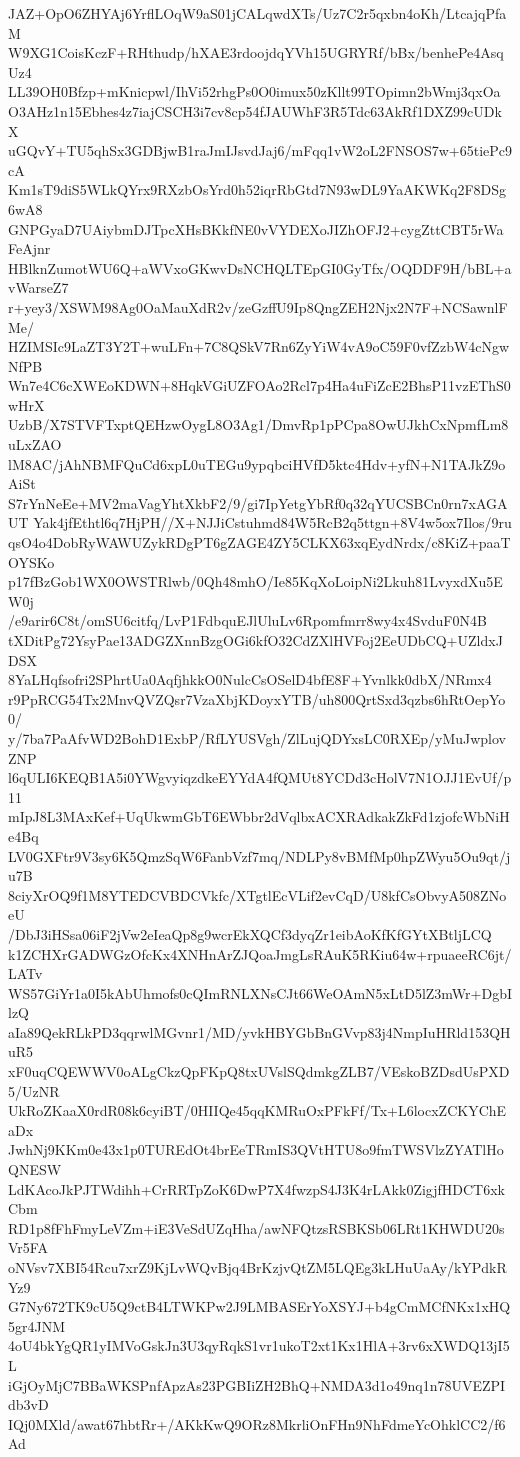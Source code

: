 JAZ+OpO6ZHYAj6YrflLOqW9aS01jCALqwdXTs/Uz7C2r5qxbn4oKh/LtcajqPfaM
W9XG1CoisKczF+RHthudp/hXAE3rdoojdqYVh15UGRYRf/bBx/benhePe4AsqUz4
LL39OH0Bfzp+mKnicpwl/IhVi52rhgPs0O0imux50zKllt99TOpimn2bWmj3qxOa
O3AHz1n15Ebhes4z7iajCSCH3i7cv8cp54fJAUWhF3R5Tdc63AkRf1DXZ99cUDkX
uGQvY+TU5qhSx3GDBjwB1raJmIJsvdJaj6/mFqq1vW2oL2FNSOS7w+65tiePc9cA
Km1sT9diS5WLkQYrx9RXzbOsYrd0h52iqrRbGtd7N93wDL9YaAKWKq2F8DSg6wA8
GNPGyaD7UAiybmDJTpcXHsBKkfNE0vVYDEXoJIZhOFJ2+cygZttCBT5rWaFeAjnr
HBlknZumotWU6Q+aWVxoGKwvDsNCHQLTEpGI0GyTfx/OQDDF9H/bBL+avWarseZ7
r+yey3/XSWM98Ag0OaMauXdR2v/zeGzffU9Ip8QngZEH2Njx2N7F+NCSawnlFMe/
HZIMSIc9LaZT3Y2T+wuLFn+7C8QSkV7Rn6ZyYiW4vA9oC59F0vfZzbW4cNgwNfPB
Wn7e4C6cXWEoKDWN+8HqkVGiUZFOAo2Rcl7p4Ha4uFiZcE2BhsP11vzEThS0wHrX
UzbB/X7STVFTxptQEHzwOygL8O3Ag1/DmvRp1pPCpa8OwUJkhCxNpmfLm8uLxZAO
lM8AC/jAhNBMFQuCd6xpL0uTEGu9ypqbciHVfD5ktc4Hdv+yfN+N1TAJkZ9oAiSt
S7rYnNeEe+MV2maVagYhtXkbF2/9/gi7IpYetgYbRf0q32qYUCSBCn0rn7xAGAUT
Yak4jfEthtl6q7HjPH//X+NJJiCstuhmd84W5RcB2q5ttgn+8V4w5ox7Ilos/9ru
qsO4o4DobRyWAWUZykRDgPT6gZAGE4ZY5CLKX63xqEydNrdx/c8KiZ+paaTOYSKo
p17fBzGob1WX0OWSTRlwb/0Qh48mhO/Ie85KqXoLoipNi2Lkuh81LvyxdXu5EW0j
/e9arir6C8t/omSU6citfq/LvP1FdbquEJlUluLv6Rpomfmrr8wy4x4SvduF0N4B
tXDitPg72YsyPae13ADGZXnnBzgOGi6kfO32CdZXlHVFoj2EeUDbCQ+UZldxJDSX
8YaLHqfsofri2SPhrtUa0AqfjhkkO0NulcCsOSelD4bfE8F+Yvnlkk0dbX/NRmx4
r9PpRCG54Tx2MnvQVZQsr7VzaXbjKDoyxYTB/uh800QrtSxd3qzbs6hRtOepYo0/
y/7ba7PaAfvWD2BohD1ExbP/RfLYUSVgh/ZlLujQDYxsLC0RXEp/yMuJwplovZNP
l6qULI6KEQB1A5i0YWgvyiqzdkeEYYdA4fQMUt8YCDd3cHolV7N1OJJ1EvUf/p11
mIpJ8L3MAxKef+UqUkwmGbT6EWbbr2dVqlbxACXRAdkakZkFd1zjofcWbNiHe4Bq
LV0GXFtr9V3sy6K5QmzSqW6FanbVzf7mq/NDLPy8vBMfMp0hpZWyu5Ou9qt/ju7B
8ciyXrOQ9f1M8YTEDCVBDCVkfc/XTgtlEcVLif2evCqD/U8kfCsObvyA508ZNoeU
/DbJ3iHSsa06iF2jVw2eIeaQp8g9wcrEkXQCf3dyqZr1eibAoKfKfGYtXBtljLCQ
k1ZCHXrGADWGzOfcKx4XNHnArZJQoaJmgLsRAuK5RKiu64w+rpuaeeRC6jt/LATv
WS57GiYr1a0I5kAbUhmofs0cQImRNLXNsCJt66WeOAmN5xLtD5lZ3mWr+DgbIlzQ
aIa89QekRLkPD3qqrwlMGvnr1/MD/yvkHBYGbBnGVvp83j4NmpIuHRld153QHuR5
xF0uqCQEWWV0oALgCkzQpFKpQ8txUVslSQdmkgZLB7/VEskoBZDsdUsPXD5/UzNR
UkRoZKaaX0rdR08k6cyiBT/0HIIQe45qqKMRuOxPFkFf/Tx+L6locxZCKYChEaDx
JwhNj9KKm0e43x1p0TUREdOt4brEeTRmIS3QVtHTU8o9fmTWSVlzZYATlHoQNESW
LdKAcoJkPJTWdihh+CrRRTpZoK6DwP7X4fwzpS4J3K4rLAkk0ZigjfHDCT6xkCbm
RD1p8fFhFmyLeVZm+iE3VeSdUZqHha/awNFQtzsRSBKSb06LRt1KHWDU20sVr5FA
oNVsv7XBI54Rcu7xrZ9KjLvWQvBjq4BrKzjvQtZM5LQEg3kLHuUaAy/kYPdkRYz9
G7Ny672TK9cU5Q9ctB4LTWKPw2J9LMBASErYoXSYJ+b4gCmMCfNKx1xHQ5gr4JNM
4oU4bkYgQR1yIMVoGskJn3U3qyRqkS1vr1ukoT2xt1Kx1HlA+3rv6xXWDQ13jI5L
iGjOyMjC7BBaWKSPnfApzAs23PGBIiZH2BhQ+NMDA3d1o49nq1n78UVEZPIdb3vD
IQj0MXld/awat67hbtRr+/AKkKwQ9ORz8MkrliOnFHn9NhFdmeYcOhklCC2/f6Ad
